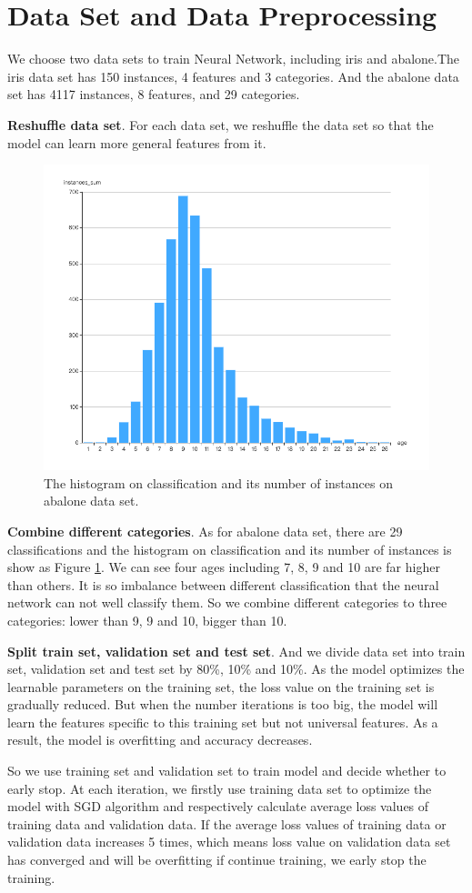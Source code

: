\section{Data Set and Data Preprocessing}
We choose two data sets to train Neural Network, including iris and abalone.The iris data set has 150 instances, 4 features and 3 categories. And the abalone data set has 4117 instances, 8 features, and 29 categories.

\textbf{Reshuffle data set}. For each data set, we reshuffle the data set so that the model can learn more general features from it. 



\begin{figure}[tb]
	\centering
	\includegraphics[width = .5\textwidth]{images/age-dis.png}
	\caption{The histogram on classification and its number of instances on abalone data set.}
	\label{fig:age-dis}
\end{figure}

\textbf{Combine different categories}. As for abalone data set, there are 29 classifications and the histogram on classification and its number of instances is show as Figure \ref{fig:age-dis}. We can see four ages including 7, 8, 9 and 10 are far higher than others. It is so imbalance between different classification that the neural network can not well classify them. So we combine different categories to three categories: lower than 9, 9 and 10, bigger than 10. 

\textbf{Split train set, validation set and test set}. And we divide data set into train set, validation set and test set by 80\%, 10\% and 10\%. As the model optimizes the learnable parameters on the training set, the loss value on the training set is gradually reduced. But when the number iterations is too big, the model will learn the features specific to this training set but not universal features. As a result, the model is overfitting and accuracy decreases.

So we use training set and validation set to train model and decide whether to early stop. At each iteration, we firstly use training data set to optimize the model with SGD algorithm and respectively calculate average loss values of training data and validation data. If the average loss values of training data or validation data increases 5 times, which means loss value on validation data set has converged and will be overfitting if continue training, we early stop the training.